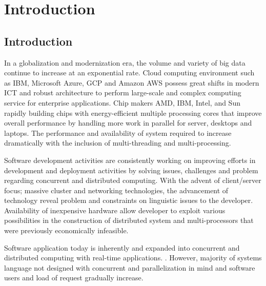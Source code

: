 \chapter{Introduction} 

\label{Chapter1} 


\doublespacing


\section{Introduction}

In a globalization and modernization era, the volume and variety of big data continue to increase at an exponential rate. Cloud computing environment such as IBM, Microsoft Azure, GCP and Amazon AWS possess great shifts in modern ICT and robust architecture to perform large-scale and complex computing service for enterprise applications.\cite{rise-of-bigdata} Chip makers AMD, IBM, Intel, and Sun rapidly building chips with energy-efficient multiple processing cores that improve overall performance by handling more work in parallel for server, desktops and laptops.  \cite{rise-of-multicore} The performance and availability of system required to increase dramatically with the inclusion of multi-threading and multi-processing.

Software development activities are consistently working on improving efforts in development and deployment activities by solving issues, challenges and problem regarding concurrent and distributed computing. With the advent of client/server focus; massive cluster and networking technologies, the advancement of technology reveal problem and constraints on linguistic issues to the developer.\cite{google-tech-talk} Availability of inexpensive hardware allow developer to exploit various possibilities in the construction of distributed system and multi-processors that were previously economically infeasible.  \cite{notation-concurrent-programming}

Software application today is inherently and expanded into concurrent and distributed computing with real-time applications. \cite{principles-concurrent-programming}. However, majority of systems language not designed with concurrent and parallelization in mind and software users and  load of request gradually increase. 


